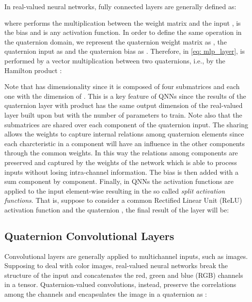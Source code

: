 \documentclass[graybox]{svmult}
\begin{document}
\noindent In real-valued neural networks, fully connected layers are generally defined as:



\noindent where  performs the multiplication between the weight matrix  and the input ,  is the bias and  is any activation function.
In order to define the same operation in the quaternion domain, we represent the  quaternion weight matrix as , the quaternion input as  and the quaternion bias as . Therefore,  in \eqref{eq: mlp_layer}, is performed by a vector multiplication between two quaternions, i.e., by the Hamilton product :



Note that  has dimensionality  since it is composed of four submatrices  and  each one with  the dimension of . This is a key feature of QNNs since the results of the quaternion layer with product  has the same output dimension of the real-valued layer built upon  but with  the number of parameters to train.
Note also that the submatrices are shared over each component of the quaternion input. The sharing allows the weights to capture internal relations among quaternion elements since each charcteristic in a component will have an influence in the other components through the common weights. In this way the relations among components are preserved and captured by the weights of the network which is able to process inputs without losing intra-channel information.
The bias  is then added with a sum component by component.
Finally, in QNNs the activation functions are applied to the input element-wise resulting in the so called \textit{split activation functions}. That is, suppose to consider a common Rectified Linear Unit (ReLU) activation function and the quaternion , the final result  of the layer will be:




\subsection{Quaternion Convolutional Layers}
\label{sec:qconv}
\noindent Convolutional layers are generally applied to multichannel inputs, such as images. Supposing to deal with color images, real-valued neural networks break the structure of the input and concatenates the red, green and blue (RGB) channels in a tensor. Quaternion-valued convolutions, instead, preserve the correlations among the channels and encapsulates the image in a quaternion as \cite{ParcolletAIR2019, ParcolletICASSP2019a, QilinQCNN2019}:
\end{document}
